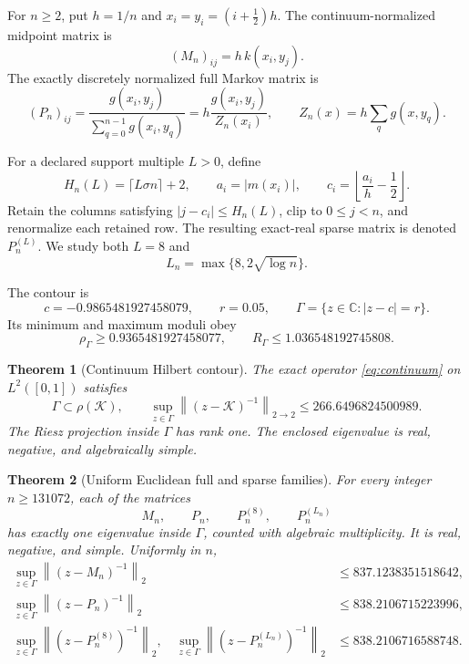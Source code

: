 \documentclass[11pt]{article}
\newtheorem{theorem}{Theorem}[section]
\theoremstyle{definition}
\theoremstyle{remark}
\newcommand{\C}{\mathbb C}
\newcommand{\cK}{\mathcal K}
\newcommand{\norm}[1]{\left\lVert #1\right\rVert}
\begin{document}
For $n\ge2$, put $h=1/n$ and
$x_i=y_i=(i+\tfrac12)h$.  The continuum-normalized midpoint matrix is
\begin{equation}
 (M_n)_{ij}=h\,k(x_i,y_j).
 \label{eq:midpoint}
\end{equation}
The exactly discretely normalized full Markov matrix is
\begin{equation}
 (P_n)_{ij}
 =\frac{g(x_i,y_j)}{\sum_{q=0}^{n-1}g(x_i,y_q)}
 =h\frac{g(x_i,y_j)}{Z_n(x_i)},
 \qquad
 Z_n(x)=h\sum_qg(x,y_q).
 \label{eq:full-matrix}
\end{equation}

For a declared support multiple $L>0$, define
\[
 H_n(L)=\lceil L\sigma n\rceil+2,\qquad
 a_i=|m(x_i)|,\qquad
 c_i=\left\lfloor\frac{a_i}{h}-\frac12\right\rfloor.
\]
Retain the columns satisfying $|j-c_i|\le H_n(L)$, clip to
$0\le j<n$, and renormalize each retained row.  The resulting exact-real
sparse matrix is denoted $P_n^{(L)}$.  We study both $L=8$ and
\begin{equation}
 L_n=\max\{8,2\sqrt{\log n}\}.
 \label{eq:adaptive-schedule}
\end{equation}

The contour is
\begin{equation}
 c=-0.9865481927458079,\qquad
 r=0.05,\qquad
 \Gamma=\{z\in\C:|z-c|=r\}.
 \label{eq:contour}
\end{equation}
Its minimum and maximum moduli obey
\[
 \rho_\Gamma\ge0.9365481927458077,\qquad
 R_\Gamma\le1.036548192745808.
\]

\begin{theorem}[Continuum Hilbert contour]
\label{thm:continuum}
The exact operator \eqref{eq:continuum} on $L^2([0,1])$ satisfies
\[
 \Gamma\subset\rho(\cK),\qquad
 \sup_{z\in\Gamma}\norm{(z-\cK)^{-1}}_{2\to2}
 \le266.6496824500989.
\]
The Riesz projection inside $\Gamma$ has rank one.  The enclosed eigenvalue
is real, negative, and algebraically simple.
\end{theorem}

\begin{theorem}[Uniform Euclidean full and sparse families]
\label{thm:uniform}
For every integer $n\ge131072$, each of the matrices
\[
 M_n,\qquad P_n,\qquad P_n^{(8)},\qquad P_n^{(L_n)}
\]
has exactly one eigenvalue inside $\Gamma$, counted with algebraic
multiplicity.  It is real, negative, and simple.  Uniformly in $n$,
\begin{align}
 \sup_{z\in\Gamma}\norm{(z-M_n)^{-1}}_2
 &\le837.1238351518642,
 \label{eq:midpoint-uniform}\\
 \sup_{z\in\Gamma}\norm{(z-P_n)^{-1}}_2
 &\le838.2106715223996,
 \label{eq:full-uniform}\\
 \sup_{z\in\Gamma}\norm{(z-P_n^{(8)})^{-1}}_2,\quad
 \sup_{z\in\Gamma}\norm{(z-P_n^{(L_n)})^{-1}}_2
 &\le838.2106716588748.
 \label{eq:sparse-uniform}
\end{align}
\end{theorem}
\end{document}
